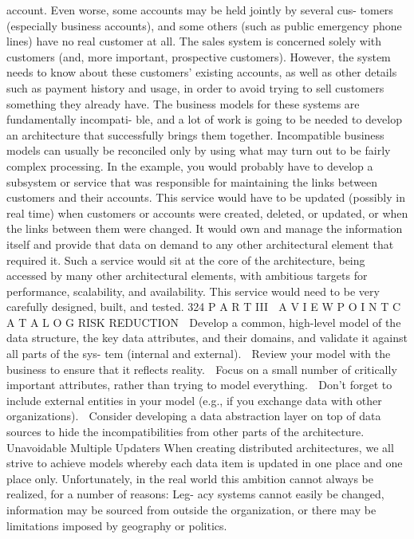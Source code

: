 account. Even worse, some accounts may be held jointly by several cus-
tomers (especially business accounts), and some others (such as public
emergency phone lines) have no real customer at all.
The sales system is concerned solely with customers (and, more
important, prospective customers). However, the system needs to know
about these customers’ existing accounts, as well as other details such
as payment history and usage, in order to avoid trying to sell customers
something they already have.
The business models for these systems are fundamentally incompati-
ble, and a lot of work is going to be needed to develop an architecture
that successfully brings them together.
Incompatible business models can usually be reconciled only by using
what may turn out to be fairly complex processing. In the example, you would
probably have to develop a subsystem or service that was responsible for
maintaining the links between customers and their accounts. This service
would have to be updated (possibly in real time) when customers or accounts
were created, deleted, or updated, or when the links between them were
changed. It would own and manage the information itself and provide that
data on demand to any other architectural element that required it.
Such a service would sit at the core of the architecture, being accessed by
many other architectural elements, with ambitious targets for performance,
scalability, and availability. This service would need to be very carefully
designed, built, and tested.
324
 P A R T III  A V I E W P O I N T C A T A L O G
RISK REDUCTION
 Develop a common, high-level model of the data structure, the key data
attributes, and their domains, and validate it against all parts of the sys-
tem (internal and external).
 Review your model with the business to ensure that it reflects reality.
 Focus on a small number of critically important attributes, rather than
trying to model everything.
 Don’t forget to include external entities in your model (e.g., if you
exchange data with other organizations).
 Consider developing a data abstraction layer on top of data sources to
hide the incompatibilities from other parts of the architecture.
Unavoidable Multiple Updaters
When creating distributed architectures, we all strive to achieve models whereby
each data item is updated in one place and one place only. Unfortunately, in the
real world this ambition cannot always be realized, for a number of reasons: Leg-
acy systems cannot easily be changed, information may be sourced from outside
the organization, or there may be limitations imposed by geography or politics.

